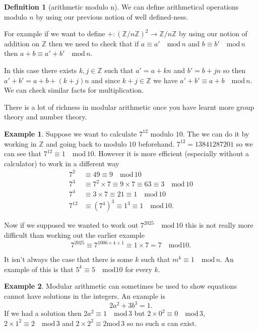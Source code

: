 \documentclass[
]{book}
\theoremstyle{definition}
\newtheorem{definition}{Definition}[chapter]
\theoremstyle{definition}
\newtheorem{example}{Example}[chapter]
\theoremstyle{definition}
\theoremstyle{definition}
\theoremstyle{remark}
\begin{document}
\begin{definition}[arithmetic modulo n]
We can define arithmetical operations modulo \(n\) by using our previous notion of well defined-ness.

For example if we want to define \(+: (\mathbb{Z}/n\mathbb{Z})^2 \rightarrow \mathbb{Z}/n\mathbb{Z}\) by using our notion of addition on \(\mathbb{Z}\) then we need to check that if \(a\equiv a' \quad \mbox{mod} \, n\) and \(b \equiv b' \quad \mbox{mod} \, n\) then \(a+b \equiv a'+b' \quad \mbox{mod} \, n\).

In this case there exists \(k, j \in \mathbb{Z}\) such that \(a' = a + k n\) and \(b' = b + j n\) so then \(a'+b' = a+b + (k+j)n\) and since \(k + j \in \mathbb{Z}\) we have \(a'+b' \equiv a+b \quad \mbox{mod} \, n\). We can check similar facts for multiplication.
\end{definition}

There is a lot of richness in modular arithmetic once you have learnt more group theory and number theory.

\begin{example}
Suppose we want to calculate \(7^{12}\) modulo \(10\). The we can do it by working in \(\mathbb{Z}\) and going back to modulo \(10\) beforehand. \(7^{12} = 13841287201\) so we can see that \(7^{12} \equiv 1 \quad \mbox{mod} \, 10\). However it is more efficient (especially without a calculator) to work in a different way
\begin{align*}
7^2 &\equiv 49 \equiv 9 \quad \mbox{mod} \, 10 \\
7^3 & \equiv 7^2 \times 7 \equiv 9 \times 7 \equiv 63 \equiv 3 \quad \mbox{mod} \, 10\\
7^4 & \equiv 3\times 7 \equiv 21 \equiv 1 \quad \mbox{mod} \, 10\\
7^{12} &\equiv (7^4)^3 \equiv 1^3 \equiv 1 \quad \mbox{mod}\, 10.
\end{align*}

Now if we supposed we wanted to work out \(7^{2025} \quad \mbox{mod} \, 10\) this is not really more difficult than working out the earlier example
\[ 7^{2025} \equiv 7^{1006\times 4 +1} \equiv 1\times 7 = 7 \quad \mbox{mod} 10.  \]

It isn't always the case that there is some \(k\) such that \(m^k \equiv 1 \quad \mbox{mod} \,n\). An example of this is that \(5^k \equiv 5 \quad \mbox{mod} 10\) for every \(k\).
\end{example}

\begin{example}
Modular arithmetic can sometimes be used to show equations cannot have solutions in the integers. An example is
\[ 2a^2 + 3b^3 = 1.  \]
If we had a solution then \(2a^2 \equiv 1 \quad \mbox{mod} \, 3\) but \(2\times 0^2 \equiv 0 \quad \mbox{mod} \, 3\), \(2 \times 1^2 \equiv 2 \quad \mbox{mod} \, 3\) and \(2 \times 2^2 \equiv 2 \mbox{mod} \, 3\) so no such \(a\) can exist.
\end{example}
\end{document}
